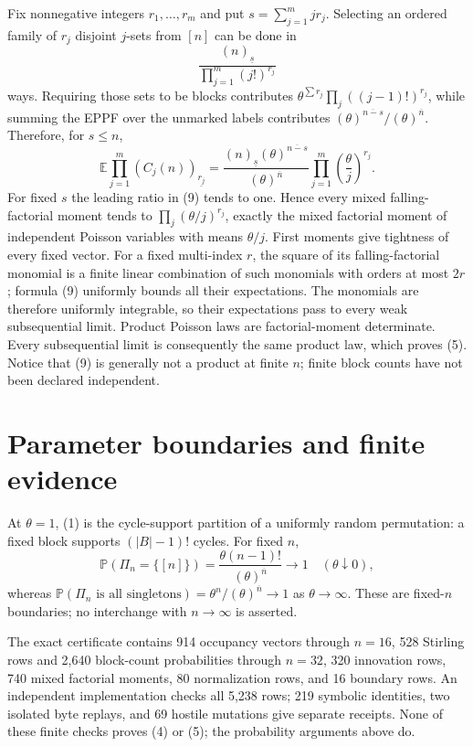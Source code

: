 \documentclass[10pt]{article}
\theoremstyle{remark}
\newcommand{\rising}[2]{(#1)^{\overline{#2}}}
\newcommand{\falling}[2]{(#1)_{\underline{#2}}}
\begin{document}
Fix nonnegative integers $r_1,\ldots,r_m$ and put
$s=\sum_{j=1}^mjr_j$.  Selecting an ordered family of $r_j$ disjoint
$j$-sets from $[n]$ can be done in
\[
 \frac{\falling{n}{s}}{\prod_{j=1}^m(j!)^{r_j}}
\]
ways.  Requiring those sets to be blocks contributes
$\theta^{\sum r_j}\prod_j((j-1)!)^{r_j}$, while summing the EPPF over the
unmarked labels contributes $\rising{\theta}{n-s}/\rising{\theta}{n}$.
Therefore, for $s\leq n$,
\begin{equation}
 \mathbb E\prod_{j=1}^m\falling{C_j(n)}{r_j}
 =\frac{\falling{n}{s}\rising{\theta}{n-s}}
        {\rising{\theta}{n}}
   \prod_{j=1}^m\left(\frac\theta j\right)^{r_j}.         \tag{9}
\end{equation}
For fixed $s$ the leading ratio in (9) tends to one.  Hence every mixed
falling-factorial moment tends to
$\prod_j(\theta/j)^{r_j}$, exactly the mixed factorial moment of
independent Poisson variables with means $\theta/j$.  First moments give
tightness of every fixed vector.  For a fixed multi-index $r$, the square
of its falling-factorial monomial is a finite linear combination of such
monomials with orders at most $2r$; formula (9) uniformly bounds all their
expectations.  The monomials are therefore uniformly integrable, so their
expectations pass to every weak subsequential limit.  Product Poisson laws
are factorial-moment determinate.  Every subsequential limit is consequently
the same product law, which proves (5).  Notice that (9) is generally not a
product at finite $n$; finite block counts have not been declared independent.

\section{Parameter boundaries and finite evidence}

At $\theta=1$, (1) is the cycle-support partition of a uniformly random
permutation: a fixed block supports $(|B|-1)!$ cycles.  For fixed $n$,
\[
 \mathbb P(\Pi_n=\{[n]\})
 =\frac{\theta(n-1)!}{\rising{\theta}{n}}\longrightarrow1
 \quad(\theta\downarrow0),
\]
whereas
$\mathbb P(\Pi_n\text{ is all singletons})=\theta^n/\rising{\theta}{n}
\to1$ as $\theta\to\infty$.  These are fixed-$n$ boundaries; no
interchange with $n\to\infty$ is asserted.

The exact certificate contains 914 occupancy vectors through $n=16$, 528
Stirling rows and 2,640 block-count probabilities through $n=32$, 320
innovation rows, 740 mixed factorial moments, 80 normalization rows, and
16 boundary rows.  An independent implementation checks all 5,238 rows;
219 symbolic identities, two isolated byte replays, and 69 hostile
mutations give separate receipts.  None of these finite checks proves (4)
or (5); the probability arguments above do.
\end{document}
